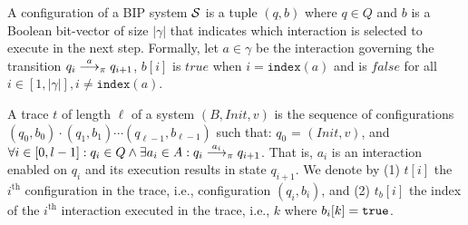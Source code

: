 \begin{definition}[Configuration]
A configuration of a BIP system ${\cal S}$ is a tuple $(q,b)$ where $q\in Q$ and $b$ is a Boolean bit-vector of size $|\gamma|$ 
that indicates which interaction is selected to execute in the next step. 
Formally, let $a \in \gamma$ be the interaction governing the transition $q_i \goesto[a]_\pi q_{i+1}$, 
$b[i]$ is $true$ when $i = \mathtt{index}(a)$ and is $false$ for all $i \in [1, |\gamma|], i\not=\mathtt{index}(a)$. 
\end{definition}

\begin{definition}[Trace]
  A trace $t$ of length $\ell$ of a system $(B,\mathit{Init}, v)$ is the sequence of configurations 
  $(q_0,b_0) \cdot (q_1,b_1) \cdots (q_{\ell-1}, b_{\ell-1})$ 
  such that: $q_0$ = $(\mathit{Init}, v)$, and 
  $\forall i\in [0,l-1]: q_i\in Q \wedge \exists a_i\in A: q_i \goesto[a_i]_\pi q_{i+1}$.
%
%
That is, $a_i$ is an interaction enabled on $q_i$ and its execution results in state $q_{i+1}$. 
We denote by (1) $t[i]$ the $i^{\text{th}}$ configuration in the trace, i.e., configuration $(q_i,b_i)$,
and (2) $t_b[i]$ the index of the $i^{\text{th}}$ interaction executed in the trace, i.e., $k$ where $b_i[k] = \true$.
\end{definition}

